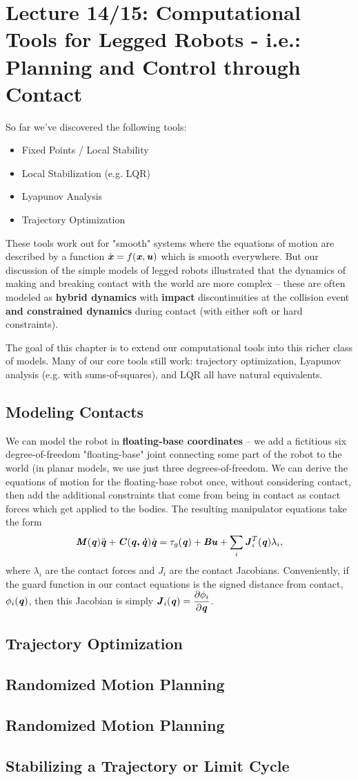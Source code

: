 \chapter{Lecture 14/15: Computational Tools for Legged Robots - i.e.: Planning and Control through Contact}
So far we've discovered the following tools:
\begin{itemize}
\item Fixed Points / Local Stability
\item Local Stabilization (e.g. LQR)
\item Lyapunov Analysis
\item Trajectory Optimization
\end{itemize}
These tools work out for "smooth" systems where the equations of motion are described by a function $\dot{\bm{\mathit{x}}}=f(\bm{\mathit{x}},\bm{\mathit{u}})$ which is smooth everywhere. But our discussion of the simple models of legged robots illustrated that the dynamics of making and breaking contact with the world are more complex -- these are often modeled as \textbf{hybrid dynamics} with \textbf{impact} discontinuities at the collision event \textbf{and constrained dynamics} during contact (with either soft or hard constraints).

The goal of this chapter is to extend our computational tools into this richer class of models. Many of our core tools still work: trajectory optimization, Lyapunov analysis (e.g. with sums-of-squares), and LQR all have natural equivalents. 

\section{Modeling Contacts}
We can model the robot in \textbf{floating-base coordinates} -- we add a fictitious six degree-of-freedom "floating-base" joint connecting some part of the robot to the world (in planar models, we use just three degrees-of-freedom. We can derive the equations of motion for the floating-base robot once, without considering contact, then add the additional constraints that come from being in contact as contact forces which get applied to the bodies. The resulting manipulator equations take the form
$$\bm{\mathit{M}}(\bm{\mathit{q}})\ddot{\bm{\mathit{q}}}+\bm{\mathit{C}}(\bm{\mathit{q,\dot{q}}})\dot{\bm{\mathit{q}}}=\tau_g(\bm{\mathit{q}})+\bm{\mathit{Bu}}+\sum_i\bm{\mathit{J}}_i^T(\bm{\mathit{q}})\lambda_i,$$
where $\lambda_i$ are the contact forces and $J_i$ are the contact Jacobians. 
Conveniently, if the guard function in our contact equations is the signed distance from contact, $\phi_i(\bm{\mathit{q}})$, then this Jacobian is simply $\bm{\mathit{J}}_i(\bm{\mathit{q}})=\dfrac{\partial\phi_i}{\partial\bm{\mathit{q}}}$.

\section{Trajectory Optimization}
\section{Randomized Motion Planning}
\section{Randomized Motion Planning}
\section{Stabilizing a Trajectory or Limit Cycle}


